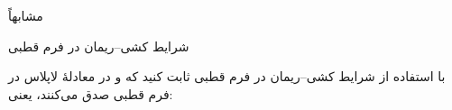 
مشابهاً


\begin{EMimportant}{شرایط کشی--ریمان در فرم قطبی}


\end{EMimportant}

\begin{EMexercise}{}

با استفاده از شرایط کشی--ریمان در فرم قطبی ثابت کنید که  و  در معادلهٔ لاپلاس در فرم قطبی صدق می‌کنند، یعنی:

\end{EMexercise}
